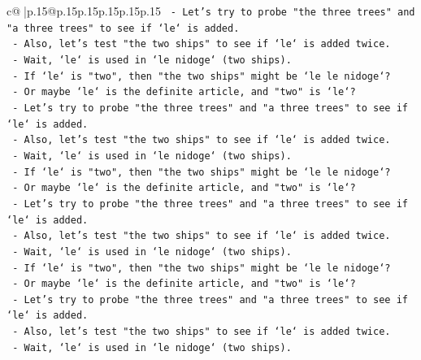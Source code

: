 \documentclass{article}
\begin{document}
{\begin{supertabular}{c@{$\;$}|p{.15\linewidth}@{}p{.15\linewidth}p{.15\linewidth}p{.15\linewidth}p{.15\linewidth}p{.15\linewidth}}
{{{\texttt{                           {-} Let's try to probe "the three trees" and "a three trees" to see if `le` is added.} \\
\texttt{                           {-} Also, let's test "the two ships" to see if `le` is added twice.} \\
\texttt{                           {-} Wait, `le` is used in `le nidoge` (two ships).} \\
\texttt{                           {-} If `le` is "two", then "the two ships" might be `le le nidoge`?} \\
\texttt{                           {-} Or maybe `le` is the definite article, and "two" is `le`?} \\
\texttt{                           {-} Let's try to probe "the three trees" and "a three trees" to see if `le` is added.} \\
\texttt{                           {-} Also, let's test "the two ships" to see if `le` is added twice.} \\
\texttt{                           {-} Wait, `le` is used in `le nidoge` (two ships).} \\
\texttt{                           {-} If `le` is "two", then "the two ships" might be `le le nidoge`?} \\
\texttt{                           {-} Or maybe `le` is the definite article, and "two" is `le`?} \\
\texttt{                           {-} Let's try to probe "the three trees" and "a three trees" to see if `le` is added.} \\
\texttt{                           {-} Also, let's test "the two ships" to see if `le` is added twice.} \\
\texttt{                           {-} Wait, `le` is used in `le nidoge` (two ships).} \\
\texttt{                           {-} If `le` is "two", then "the two ships" might be `le le nidoge`?} \\
\texttt{                           {-} Or maybe `le` is the definite article, and "two" is `le`?} \\
\texttt{                           {-} Let's try to probe "the three trees" and "a three trees" to see if `le` is added.} \\
\texttt{                           {-} Also, let's test "the two ships" to see if `le` is added twice.} \\
\texttt{                           {-} Wait, `le` is used in `le nidoge` (two ships).} \\
}}}
\end{supertabular}}
\end{document}
